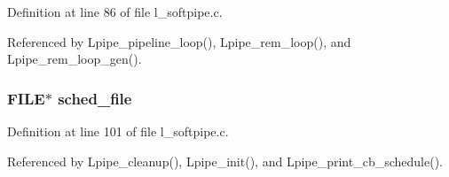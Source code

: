 Definition at line 86 of file l\_\-softpipe.c.

Referenced by Lpipe\_\-pipeline\_\-loop(), Lpipe\_\-rem\_\-loop(), and Lpipe\_\-rem\_\-loop\_\-gen().
\subsubsection{\setlength{\rightskip}{0pt plus 5cm}FILE$\ast$ \bf{sched\_\-file}}\label{l__softpipe__int_8h_dfcefa1a772012ef80d3b8f14f3f150b}




Definition at line 101 of file l\_\-softpipe.c.

Referenced by Lpipe\_\-cleanup(), Lpipe\_\-init(), and Lpipe\_\-print\_\-cb\_\-schedule().